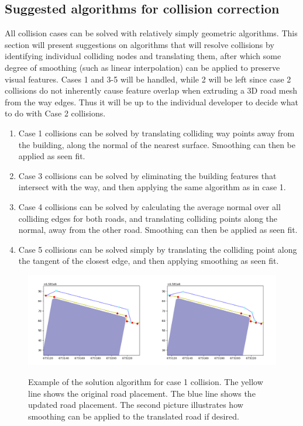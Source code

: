 \documentclass{kththesis}
\begin{document}
\subsection{Suggested algorithms for collision correction}

All collision cases can be solved with relatively simply geometric algorithms. This section will present suggestions on algorithms that will resolve collisions by identifying individual colliding nodes and translating them, after which some degree of smoothing (such as linear interpolation) can be applied to preserve visual features. Cases 1 and 3-5 will be handled, while 2 will be left since case 2 collisions do not inherently cause feature overlap when extruding a 3D road mesh from the way edges. Thus it will be up to the individual developer to decide what to do with Case 2 collisions.

\begin{enumerate}
\item Case 1 collisions can be solved by translating colliding way points away from the building, along the normal of the nearest surface. Smoothing can then be applied as seen fit.
\item Case 3 collisions can be solved by eliminating the building features that intersect with the way, and then applying the same algorithm as in case 1.
\item Case 4 collisions can be solved by calculating the average normal over all colliding edges for both roads, and translating colliding points along the normal, away from the other road. Smoothing can then be applied as seen fit.
\item Case 5 collisions can be solved simply by translating the colliding point along the tangent of the closest edge, and then applying smoothing as seen fit.
\end{enumerate}

\begin{figure}[H]
    \centering
    \includegraphics[width=\textwidth,height=0.5\textheight,keepaspectratio]{img_feature_overlap_fix_1}
    \label{fig:collision-case-1}
    \caption{Example of the solution algorithm for case 1 collision. The yellow line shows the original road placement. The blue line shows the updated road placement. The second picture illustrates how smoothing can be applied to the translated road if desired.}
\end{figure}
\end{document}
